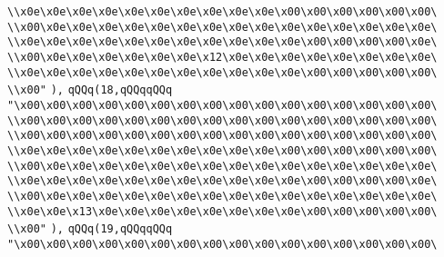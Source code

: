 \verb|\\x0e\x0e\x0e\x0e\x0e\x0e\x0e\x0e\x0e\x0e\x00\x00\x00\x00\x00\x00\|\newline
\verb|\\x00\x0e\x0e\x0e\x0e\x0e\x0e\x0e\x0e\x0e\x0e\x0e\x0e\x0e\x0e\x0e\|\newline
\verb|\\x0e\x0e\x0e\x0e\x0e\x0e\x0e\x0e\x0e\x0e\x0e\x00\x00\x00\x00\x0e\|\newline
\verb|\\x00\x0e\x0e\x0e\x0e\x0e\x0e\x12\x0e\x0e\x0e\x0e\x0e\x0e\x0e\x0e\|\newline
\verb|\\x0e\x0e\x0e\x0e\x0e\x0e\x0e\x0e\x0e\x0e\x0e\x00\x00\x00\x00\x00\|\newline
\verb|\\x00"|\newline
\verb|),|\newline
\verb|qQQq(18,qQQqqQQq|\newline
\verb|"\x00\x00\x00\x00\x00\x00\x00\x00\x00\x00\x00\x00\x00\x00\x00\x00\|\newline
\verb|\\x00\x00\x00\x00\x00\x00\x00\x00\x00\x00\x00\x00\x00\x00\x00\x00\|\newline
\verb|\\x00\x00\x00\x00\x00\x00\x00\x00\x00\x00\x00\x00\x00\x00\x00\x00\|\newline
\verb|\\x0e\x0e\x0e\x0e\x0e\x0e\x0e\x0e\x0e\x0e\x00\x00\x00\x00\x00\x00\|\newline
\verb|\\x00\x0e\x0e\x0e\x0e\x0e\x0e\x0e\x0e\x0e\x0e\x0e\x0e\x0e\x0e\x0e\|\newline
\verb|\\x0e\x0e\x0e\x0e\x0e\x0e\x0e\x0e\x0e\x0e\x0e\x00\x00\x00\x00\x0e\|\newline
\verb|\\x00\x0e\x0e\x0e\x0e\x0e\x0e\x0e\x0e\x0e\x0e\x0e\x0e\x0e\x0e\x0e\|\newline
\verb|\\x0e\x0e\x13\x0e\x0e\x0e\x0e\x0e\x0e\x0e\x0e\x00\x00\x00\x00\x00\|\newline
\verb|\\x00"|\newline
\verb|),|\newline
\verb|qQQq(19,qQQqqQQq|\newline
\verb|"\x00\x00\x00\x00\x00\x00\x00\x00\x00\x00\x00\x00\x00\x00\x00\x00\|\newline
